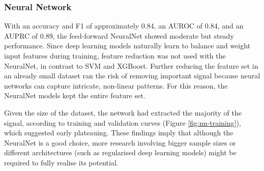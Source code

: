 \documentclass[a4paper,12pt]{article}
\begin{document}
\subsubsection{Neural Network}
With an accuracy and F1 of approximately 0.84, an AUROC of 0.84, and an AUPRC of 0.89, the feed-forward NeuralNet showed moderate but steady performance.  Since deep learning models naturally learn to balance and weight input features during training, feature reduction was not used with the NeuralNet, in contrast to SVM and XGBoost.  Further reducing the feature set in an already small dataset ran the risk of removing important signal because neural networks can capture intricate, non-linear patterns.  For this reason, the NeuralNet models kept the entire feature set.

Given the size of the dataset, the network had extracted the majority of the signal, according to training and validation curves (Figure \ref{fig:nn-training}), which suggested early plateauing.  These findings imply that although the NeuralNet is a good choice, more research involving bigger sample sizes or different architectures (such as regularised deep learning models) might be required to fully realise its potential.
\end{document}
